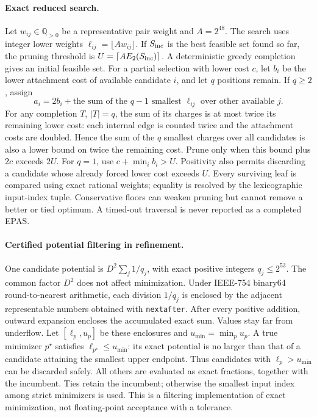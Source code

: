 \documentclass[a4paper,12pt]{article}
\numberwithin{equation}{section}
\begin{document}
\paragraph{Exact reduced search.}
Let $w_{ij}\in\mathbb Q_{>0}$ be a representative pair weight and $A=2^{48}$. The search uses
integer lower weights $\ell_{ij}=\lfloor Aw_{ij}\rfloor$. If $S_{\rm inc}$ is the best
feasible set found so far, the pruning threshold is $U=\lceil A E_2(S_{\rm inc})\rceil$.
A deterministic greedy completion gives an initial feasible set. For a partial selection with lower cost $c$, let $b_i$ be the lower
attachment cost of available candidate $i$, and let $q$ positions remain. If $q\ge2$, assign
\[
 a_i=2b_i+\text{the sum of the }q-1\text{ smallest }\ell_{ij}
 \text{ over other available }j.
\]
For any completion $T$, $|T|=q$, the sum of its charges is at most twice its remaining lower cost:
each internal edge is counted twice and the attachment costs are doubled. Hence the sum of the $q$
smallest charges over all candidates is also a lower bound on twice the remaining cost. Prune only
when this bound plus $2c$ exceeds $2U$. For $q=1$, use $c+\min_i b_i>U$. Positivity also permits
discarding a candidate whose already forced lower cost exceeds $U$. Every surviving leaf is
compared using exact rational weights; equality is resolved by the lexicographic input-index
tuple. Conservative floors can weaken pruning but cannot remove a better or tied optimum. A
timed-out traversal is never reported as a completed EPAS.

\paragraph{Certified potential filtering in refinement.}
One candidate potential is $D^2\sum_j1/q_j$, with exact positive integers $q_j\le2^{53}$. The
common factor $D^2$ does not affect minimization. Under IEEE-754 binary64 round-to-nearest
arithmetic, each division $1/q_j$ is enclosed by the adjacent representable numbers obtained with
\texttt{nextafter}. After every positive addition, outward expansion encloses the accumulated
exact sum. Values stay far from underflow. Let $[\ell_p,u_p]$ be these enclosures and
$u_{\min}=\min_p u_p$. A true minimizer $p^\star$ satisfies $\ell_{p^\star}\le u_{\min}$: its
exact potential is no larger than that of a candidate attaining the smallest upper endpoint. Thus
candidates with $\ell_p>u_{\min}$ can be discarded safely. All others are evaluated as exact
fractions, together with the incumbent. Ties retain the incumbent; otherwise the smallest input
index among strict minimizers is used. This is a filtering implementation of exact minimization,
not floating-point acceptance with a tolerance.
\end{document}
